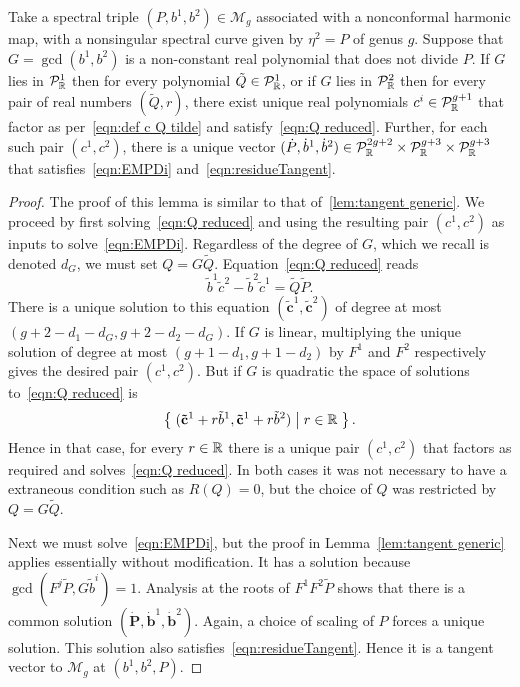 \documentclass{article}
\begin{document}
\begin{lem}[Case (b)]\label{lem:tangent G}
Take a spectral triple $(P,b^1,b^2)\in\mathcal{M}_g$ associated with a nonconformal harmonic map, with a nonsingular spectral curve given by $\eta^2 = P$ of genus $g$. Suppose that $G = \gcd(b^1,b^2)$ is a non-constant real polynomial that does not divide $P$. 
If $G$ lies in $\mathcal{P}^1_{\mathbb{R}}$ then for every polynomial $\tilde{Q}\in\mathcal{P}^1_{\mathbb{R}}$, or if $G$ lies in $\mathcal{P}^2_{\mathbb{R}}$ then for every pair of real numbers $(\tilde{Q},r)$, there exist unique real polynomials $c^i\in\mathcal{P}^{g+1}_{\mathbb{R}}$ that factor as per~\eqref{eqn:def c Q tilde} and satisfy~\eqref{eqn:Q reduced}. Further, for each such pair $(c^1,c^2)$, there is a unique vector $(\dot P, \dot b^1, \dot b^2) \in \mathcal{P}_{\mathbb{R}}^{2g+2}\times\mathcal{P}_{\mathbb{R}}^{g+3}\times\mathcal{P}_{\mathbb{R}}^{g+3}$ that satisfies~\eqref{eqn:EMPDi} and~\eqref{eqn:residueTangent}.

\begin{proof}
The proof of this lemma is similar to that of~\ref{lem:tangent generic}. We proceed by first solving~\eqref{eqn:Q reduced} and using the resulting pair $(c^1,c^2)$ as inputs to solve~\eqref{eqn:EMPDi}. Regardless of the degree of $G$, which we recall is denoted $d_G$, we must set $Q = G\tilde{Q}$. Equation~\eqref{eqn:Q reduced} reads
\[
\tilde{b}^1\tilde{c}^2 - \tilde{b}^2\tilde{c}^1 = \tilde{Q}\tilde{P}.
\]
There is a unique solution to this equation $(\mathbf{\tilde{c}}^1,\mathbf{\tilde{c}}^2)$ of degree at most $(g+2-d_1-d_G,g+2-d_2-d_G)$. 
If $G$ is linear, multiplying the unique solution of degree at most $(g+1-d_1,g+1-d_2)$ by $F^1$ and $F^2$ respectively gives the desired pair $(c^1,c^2)$.
But if $G$ is quadratic the space of solutions to~\eqref{eqn:Q reduced} is
\[
\left\{\;  (\mathbf{\tilde{c}}^1 + r\tilde{b}^1, \mathbf{\tilde{c}}^1 + r\tilde{b}^2)  \;\middle|\;  r \in \mathbb{R}  \;\right\}.
\]
Hence in that case, for every $r\in\mathbb{R}$ there is a unique pair $(c^1, c^2)$ that factors as required and solves~\eqref{eqn:Q reduced}. In both cases it was not necessary to have a extraneous condition such as $R(Q)=0$, but the choice of $Q$ was restricted by $Q = G\tilde{Q}$.

Next we must solve~\eqref{eqn:EMPDi}, but the proof in Lemma~\ref{lem:tangent generic} applies essentially without modification. 
It has a solution because $\gcd(F^j\tilde{P},G\tilde{b}^i) = 1$.
Analysis at the roots of $F^1F^2\tilde{P}$ shows that there is a common solution $(\mathbf{\dot{P}}, \mathbf{\dot{b}}^1, \mathbf{\dot{b}}^2)$. Again, a choice of scaling of $P$ forces a unique solution. This solution also satisfies~\eqref{eqn:residueTangent}. Hence it is a tangent vector to $\mathcal{M}_g$ at $(b^1,b^2,P)$.
\end{proof}
\end{lem}
\end{document}
